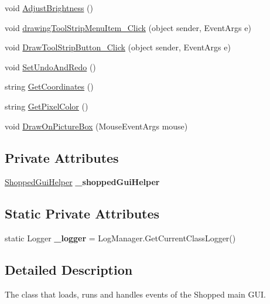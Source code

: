 \begin{DoxyCompactItemize}
void \hyperlink{class_u_i_1_1_shopped_gui_a3eaf4cafecc8ce1879a496f5ffe9e7a9}{AdjustBrightness} ()
\item 
void \hyperlink{class_u_i_1_1_shopped_gui_aca1101f73de09ed9dade7398c1415bd0}{drawingToolStripMenuItem\_\-Click} (object sender, EventArgs e)
\item 
void \hyperlink{class_u_i_1_1_shopped_gui_af3350e3e7c086196264ad9443eb4f2ac}{DrawToolStripButton\_\-Click} (object sender, EventArgs e)
\item 
void \hyperlink{class_u_i_1_1_shopped_gui_a99e47a8b843bf190a7a0e3f8b3f5abb9}{SetUndoAndRedo} ()
\item 
string \hyperlink{class_u_i_1_1_shopped_gui_a2ec6c1eaa3745958b54c6c589eb55028}{GetCoordinates} ()
\item 
string \hyperlink{class_u_i_1_1_shopped_gui_ae231691f0dd77892c3e09d2c5ab033c3}{GetPixelColor} ()
\item 
void \hyperlink{class_u_i_1_1_shopped_gui_a1b4d9d49a910f9a456e86a80bb2c7b35}{DrawOnPictureBox} (MouseEventArgs mouse)
\end{DoxyCompactItemize}
\subsection*{Private Attributes}
\begin{DoxyCompactItemize}
\item 
\hypertarget{class_u_i_1_1_shopped_gui_a19139212d3779912c914ee07e2365cf6}{
\hyperlink{class_core_1_1_shopped_gui_helper}{ShoppedGuiHelper} {\bfseries \_\-shoppedGuiHelper}}
\label{class_u_i_1_1_shopped_gui_a19139212d3779912c914ee07e2365cf6}

\end{DoxyCompactItemize}
\subsection*{Static Private Attributes}
\begin{DoxyCompactItemize}
\item 
\hypertarget{class_u_i_1_1_shopped_gui_adb7af204c999d32a30fae28c25a11267}{
static Logger {\bfseries \_\-logger} = LogManager.GetCurrentClassLogger()}
\label{class_u_i_1_1_shopped_gui_adb7af204c999d32a30fae28c25a11267}

\end{DoxyCompactItemize}


\subsection{Detailed Description}
The class that loads, runs and handles events of the Shopped main GUI.


